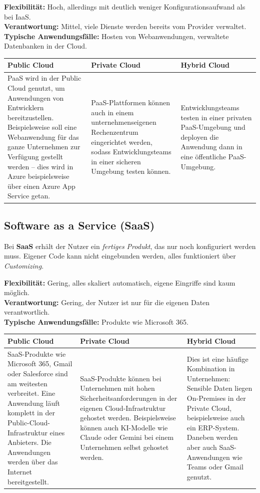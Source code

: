 \textbf{Flexibilität:} Hoch, allerdings mit deutlich weniger
Konfigurationsaufwand als bei IaaS.\\
\textbf{Verantwortung:} Mittel, viele Dienste werden bereits vom Provider
verwaltet.\\
\textbf{Typische Anwendungsfälle:} Hosten von Webanwendungen, verwaltete
Datenbanken in der Cloud.
\begin{table}[h]
    \centering
    \begin{tabularx}{\linewidth}{|X|X|X|}
        \hline
        \textbf{Public Cloud} & \textbf{Private Cloud} & \textbf{Hybrid Cloud} \\
        \hline
        PaaS wird in der Public Cloud genutzt, um Anwendungen von Entwicklern bereitzustellen. Beispielsweise soll eine Webanwendung für das ganze Unternehmen zur Verfügung gestellt werden – dies wird in Azure beispielsweise über einen Azure App Service getan. & PaaS-Plattformen können auch in einem unternehmenseigenen Rechenzentrum eingerichtet werden, sodass Entwicklungsteams in einer sicheren Umgebung testen können. & Entwicklungsteams testen in einer privaten PaaS-Umgebung und deployen die Anwendung dann in eine öffentliche PaaS-Umgebung. \\
        \hline
    \end{tabularx}
\end{table}
\subsection{Software as a Service (SaaS)}
Bei \textbf{SaaS} erhält der Nutzer ein \emph{fertiges Produkt}, das nur noch konfiguriert
werden muss. Eigener Code kann nicht eingebunden werden, alles funktioniert
über \textit{Customizing}.

\textbf{Flexibilität:} Gering, alles skaliert automatisch, eigene Eingriffe
sind kaum möglich.\\
\textbf{Verantwortung:} Gering, der Nutzer ist nur für die eigenen Daten
verantwortlich.\\
\textbf{Typische Anwendungsfälle:} Produkte wie Microsoft 365.
\begin{table}[h]
    \centering
    \begin{tabularx}{\linewidth}{|X|X|X|}
        \hline
        \textbf{Public Cloud} & \textbf{Private Cloud} & \textbf{Hybrid Cloud} \\
        \hline
        SaaS-Produkte wie Microsoft 365, Gmail oder Salesforce sind am weitesten verbreitet. Eine Anwendung läuft komplett in der Public-Cloud-Infrastruktur eines Anbieters. Die Anwendungen werden über das Internet bereitgestellt. & SaaS-Produkte können bei Unternehmen mit hohen Sicherheitsanforderungen in der eigenen Cloud-Infrastruktur gehostet werden. Beispielsweise können auch KI-Modelle wie Claude oder Gemini bei einem Unternehmen selbst gehostet werden. & Dies ist eine häufige Kombination in Unternehmen: Sensible Daten liegen On-Premises in der Private Cloud, beispielsweise auch ein ERP-System. Daneben werden aber auch SaaS-Anwendungen wie Teams oder Gmail genutzt. \\
        \hline
    \end{tabularx}
\end{table}
\newpage
